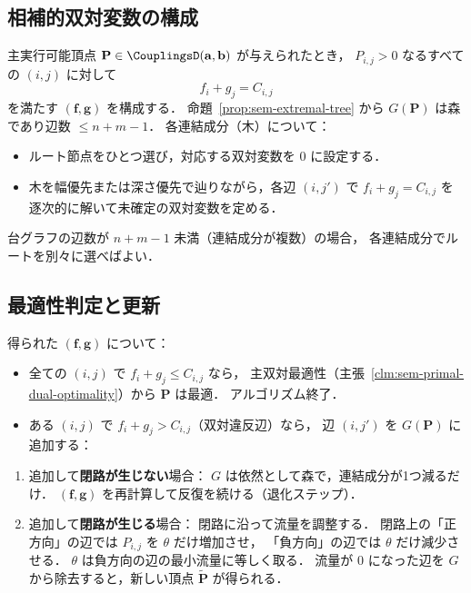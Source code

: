 \subsection{相補的双対変数の構成}
\label{subsec:sem-dual-from-primal}

主実行可能頂点 $\mathbf{P} \in \CouplingsD(\mathbf{a}, \mathbf{b})$ が与えられたとき，
$P_{i,j} > 0$ なるすべての $(i, j)$ に対して
\[
  f_i + g_j = C_{i,j}
\]
を満たす $(\mathbf{f}, \mathbf{g})$ を構成する．
命題~\ref{prop:sem-extremal-tree} から $G(\mathbf{P})$ は森であり辺数 $\leq n + m - 1$．
各連結成分（木）について：
\begin{itemize}
  \item ルート節点をひとつ選び，対応する双対変数を $0$ に設定する．
  \item 木を幅優先または深さ優先で辿りながら，各辺 $(i, j')$ で
    $f_i + g_j = C_{i,j}$ を逐次的に解いて未確定の双対変数を定める．
\end{itemize}
台グラフの辺数が $n + m - 1$ 未満（連結成分が複数）の場合，
各連結成分でルートを別々に選べばよい．

\subsection{最適性判定と更新}
\label{subsec:sem-simplex-update}

得られた $(\mathbf{f}, \mathbf{g})$ について：
\begin{itemize}
  \item 全ての $(i, j)$ で $f_i + g_j \leq C_{i,j}$ なら，
    主双対最適性（主張~\ref{clm:sem-primal-dual-optimality}）から $\mathbf{P}$ は最適．
    アルゴリズム終了．
  \item ある $(i, j)$ で $f_i + g_j > C_{i,j}$（双対違反辺）なら，
    辺 $(i, j')$ を $G(\mathbf{P})$ に追加する：
\end{itemize}

\begin{enumerate}
  \item[(a)] 追加して\textbf{閉路が生じない}場合：
    $G$ は依然として森で，連結成分が1つ減るだけ．
    $(\mathbf{f}, \mathbf{g})$ を再計算して反復を続ける（退化ステップ）．
  \item[(b)] 追加して\textbf{閉路が生じる}場合：
    閉路に沿って流量を調整する．
    閉路上の「正方向」の辺では $P_{i,j}$ を $\theta$ だけ増加させ，
    「負方向」の辺では $\theta$ だけ減少させる．
    $\theta$ は負方向の辺の最小流量に等しく取る．
    流量が $0$ になった辺を $G$ から除去すると，新しい頂点 $\tilde{\mathbf{P}}$ が得られる．
\end{enumerate}

